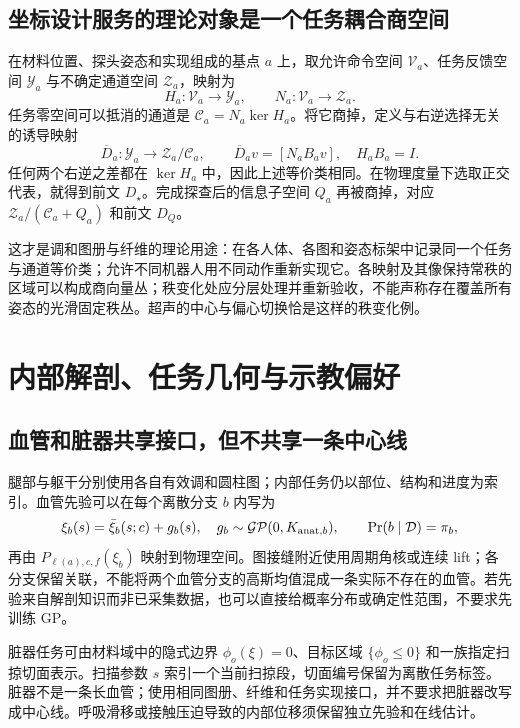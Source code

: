 \documentclass[11pt,a4paper]{article}
\numberwithin{equation}{section}
\theoremstyle{definition}
\begin{document}
\subsection{坐标设计服务的理论对象是一个任务耦合商空间}
在材料位置、探头姿态和实现组成的基点 $a$ 上，取允许命令空间 $\mathcal V_a$、任务反馈空间 $\mathcal Y_a$ 与不确定通道空间 $\mathcal Z_a$，映射为
\begin{equation}
 H_a:\mathcal V_a\longrightarrow\mathcal Y_a,\qquad
 N_a:\mathcal V_a\longrightarrow\mathcal Z_a.
\end{equation}
任务零空间可以抵消的通道是 $\mathcal C_a=N_a\ker H_a$。将它商掉，定义与右逆选择无关的诱导映射
\begin{equation}
 \overline D_a:\mathcal Y_a\longrightarrow\mathcal Z_a/\mathcal C_a,
 \qquad \overline D_av=[N_aB_av],\quad H_aB_a=I.
\end{equation}
任何两个右逆之差都在 $\ker H_a$ 中，因此上述等价类相同。在物理度量下选取正交代表，就得到前文 $D_\star$。完成探查后的信息子空间 $Q_a$ 再被商掉，对应 $\mathcal Z_a/(\mathcal C_a+Q_a)$ 和前文 $D_Q$。

这才是调和图册与纤维的理论用途：在各人体、各图和姿态标架中记录同一个任务与通道等价类；允许不同机器人用不同动作重新实现它。各映射及其像保持常秩的区域可以构成商向量丛；秩变化处应分层处理并重新验收，不能声称存在覆盖所有姿态的光滑固定秩丛。超声的中心与偏心切换恰是这样的秩变化例。





\section{内部解剖、任务几何与示教偏好}
\label{sec:v43:anatomy-rules}
\subsection{血管和脏器共享接口，但不共享一条中心线}
腿部与躯干分别使用各自有效调和圆柱图；内部任务仍以部位、结构和进度为索引。血管先验可以在每个离散分支 $b$ 内写为
\begin{equation}
 \xi_b(s)=\bar\xi_b(s;c)+g_b(s),\quad
 g_b\sim\mathcal{GP}(0,K_{{\rm anat},b}),\qquad
 \Pr(b\mid\mathcal D)=\pi_b,
\end{equation}
再由 $P_{\ell(a),c,f}(\xi_b)$ 映射到物理空间。图接缝附近使用周期角核或连续 lift；各分支保留关联，不能将两个血管分支的高斯均值混成一条实际不存在的血管。若先验来自解剖知识而非已采集数据，也可以直接给概率分布或确定性范围，不要求先训练 GP。

脏器任务可由材料域中的隐式边界 $\phi_o(\xi)=0$、目标区域 $\{\phi_o\le0\}$ 和一族指定扫掠切面表示。扫描参数 $s$ 索引一个当前扫掠段，切面编号保留为离散任务标签。脏器不是一条长血管；使用相同图册、纤维和任务实现接口，并不要求把脏器改写成中心线。呼吸滑移或接触压迫导致的内部位移须保留独立先验和在线估计。
\end{document}
